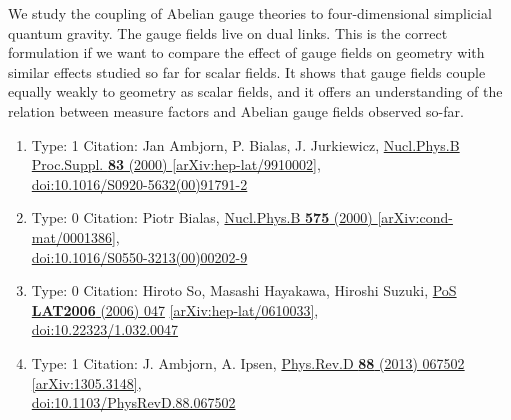 \documentclass[a4paper,10pt]{article}
\begin{document}
\begin{enumerate}
We study the coupling of Abelian gauge theories to four-dimensional simplicial quantum gravity. The gauge fields live on dual links. This is the correct formulation if we want to compare the effect of gauge fields on geometry with similar effects studied so far for scalar fields. It shows that gauge fields couple equally weakly to geometry as scalar fields, and it offers an understanding of the relation between measure factors and Abelian gauge fields observed so-far.
\begin{enumerate}
  \item Type: 1 Citation: Jan Ambjorn, P. Bialas, J. Jurkiewicz, \href{https://www.doi.org/10.1016/S0920-5632(00)91791-2}{Nucl.Phys.B Proc.Suppl. {\bf 83} (2000) }  \href{https://arxiv.org/abs/hep-lat/9910002}{[arXiv:hep-lat/9910002]},\\\href{https://www.doi.org/10.1016/S0920-5632(00)91791-2}{doi:10.1016/S0920-5632(00)91791-2}
  \item Type: 0 Citation: Piotr Bialas, \href{https://www.doi.org/10.1016/S0550-3213(00)00202-9}{Nucl.Phys.B {\bf 575} (2000) }  \href{https://arxiv.org/abs/cond-mat/0001386}{[arXiv:cond-mat/0001386]},\\\href{https://www.doi.org/10.1016/S0550-3213(00)00202-9}{doi:10.1016/S0550-3213(00)00202-9}
  \item Type: 0 Citation: Hiroto So, Masashi Hayakawa, Hiroshi Suzuki, \href{https://www.doi.org/10.22323/1.032.0047}{PoS {\bf LAT2006} (2006) 047}  \href{https://arxiv.org/abs/hep-lat/0610033}{[arXiv:hep-lat/0610033]},\\\href{https://www.doi.org/10.22323/1.032.0047}{doi:10.22323/1.032.0047}
  \item Type: 1 Citation: J. Ambjorn, A. Ipsen, \href{https://www.doi.org/10.1103/PhysRevD.88.067502}{Phys.Rev.D {\bf 88} (2013) 067502}  \href{https://arxiv.org/abs/1305.3148}{[arXiv:1305.3148]},\\\href{https://www.doi.org/10.1103/PhysRevD.88.067502}{doi:10.1103/PhysRevD.88.067502}

\end{enumerate}
\end{enumerate}
\end{document}
